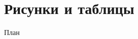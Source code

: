 \documentclass{beamer}
\begin{document}
\section{Рисунки и таблицы}

\begin{frame}{План}
\begin{multicols}{2}
\tableofcontents[currentsection]
\end{multicols}
\end{frame}

\end{document}
